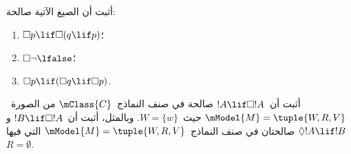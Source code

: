 \documentclass[../../../include/open-logic-section]{subfiles}
\begin{document}
\begin{prob}
  أثبت أن الصيغ الآتية صالحة:
  \begin{enumerate}
  \item $\Box p \lif \Box (q \lif p)$؛
  \item $\Box \lnot \lfalse$؛
  \item $\Box p \lif (\Box q \lif \Box p)$.
  \end{enumerate}
\end{prob}

\begin{prob}
  أثبت أن~$!A \lif \Box!A$ صالحة في صنف النماذج~$\mClass{C}$ من
  الصورة~$\mModel{M} = \tuple{W, R, V}$ حيث~$W = \{w\}$. وبالمثل،
  أثبت أن~$!B \lif \Box !A$ و$\Diamond !A \lif !B$ صالحتان في صنف
  النماذج~$\mModel{M} = \tuple{W, R, V}$ التي فيها
  $R = \emptyset$.
\end{prob}
\end{document}
